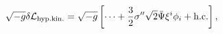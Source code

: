 \begin{equation}
  \sqrt{-g}\delta{\cal L}_{\rm hyp.kin.} 
    = \sqrt{-g}\left[\cdots 
    + \frac32 \sigma''\sqrt2 \bar{\Psi}\xi^i\phi_i + \mbox{h.c.} \right],
\end{equation}

